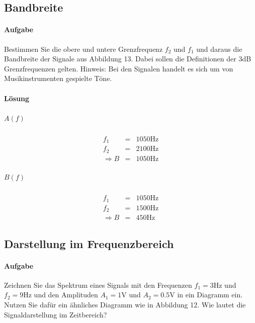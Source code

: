 \documentclass[10pt]{scrreprt}
\begin{document}
        \subsection{Bandbreite}
        \paragraph{Aufgabe}
        Bestimmen Sie die obere und untere Grenzfrequenz $f_2$ und $f_1$ und daraus die Bandbreite
        der Signale aus Abbildung 13. Dabei sollen die Definitionen der 3dB Grenzfrequenzen
        gelten. Hinweis: Bei den Signalen handelt es sich um von Musikinstrumenten gespielte
        Töne.

        \paragraph{Lösung}
        \subparagraph{$A(f)$}
        \begin{eqnarray*}
            f_1 &=& 1050 \si{\hertz}\\
            f_2 &=& 2100 \si{\hertz}\\
            \Rightarrow B &=& 1050\si{\hertz}
        \end{eqnarray*}

        \subparagraph{$B(f)$}
        \begin{eqnarray*}
            f_1 &=& 1050 \si{\hertz}\\
            f_2 &=& 1500 \si{\hertz}\\
            \Rightarrow B &=& 450\si{\hertz}
        \end{eqnarray*}

        \subsection{Darstellung im Frequenzbereich}
        \paragraph{Aufgabe}
        Zeichnen Sie das Spektrum eines Signals mit den Frequenzen $f_1=3\si{\hertz}$ und $f_2=9\si{\hertz}$
        und den Amplituden $A_1 = 1\si{\volt}$ und $A_2 = 0.5\si{\volt}$ in ein Diagramm ein. Nutzen Sie dafür
        ein ähnliches Diagramm wie in Abbildung 12. Wie lautet die Signaldarstellung im Zeitbereich?
\end{document}
